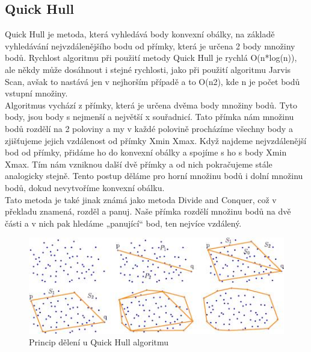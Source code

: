 \documentclass[a4paper,11pt,twoside]{article}
\begin{document}
\subsection{Quick Hull}
Quick Hull je metoda, která vyhledává body konvexní obálky, na základě vyhledávání nejvzdálenějšího bodu od přímky, která je určena 2 body množiny bodů. Rychlost algoritmu při použití metody Quick Hull je rychlá O(n*log(n)), ale někdy může dosáhnout i stejné rychlosti, jako při použití algoritmu Jarvis Scan, avšak to nastává jen v nejhorším případě a to O(n2), kde n je počet bodů vstupní množiny. \\
\indent Algoritmus vychází z přímky, která je určena dvěma body množiny bodů. Tyto body, jsou body s nejmenší a největší x souřadnicí. Tato přímka nám množinu bodů rozdělí na 2 poloviny a my v každé polovině procházíme všechny body a zjišťujeme jejich vzdálenost od přímky Xmin Xmax. Když najdeme nejvzdálenější bod od přímky, přidáme ho do konvexní obálky a spojíme s ho s body Xmin Xmax. Tím nám vzniknou další dvě přímky a od nich pokračujeme stále analogicky stejně. Tento postup děláme pro horní množinu bodů i dolní množinu bodů, dokud nevytvoříme konvexní obálku. \\
\indent Tato metoda je také jinak známá jako metoda Divide and Conquer, což v překladu znamená, rozděl a panuj. Naše přímka rozdělí množinu bodů na dvě části a v nich pak hledáme „panující“ bod, ten nejvíce vzdálený.

\vspace{0.2cm}
\begin{figure}[hbt!] 
\begin{center}
\includegraphics[width=15cm]{pictures/hull2.jpg} 
\caption[Princip dělení  u Quick Hull algoritmu]{Princip dělení  u Quick Hull algoritmu \cite{quick}}
\label{fig:quick}
\end{center}
\end{figure}
\vspace{-0.4cm}

\newpage
\vspace*{-1cm}
\end{document}
